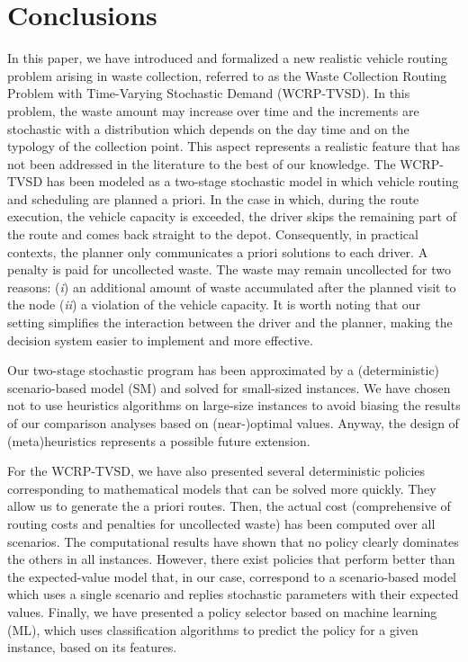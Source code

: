 \documentclass[preprint,11pt,authoryear]{elsarticle}
\begin{document}
\section{Conclusions}\label{end}

In this paper, we have introduced and formalized a new realistic vehicle routing problem arising in waste collection, referred to as the Waste Collection Routing Problem with Time-Varying Stochastic Demand (WCRP-TVSD). 
In this problem, the waste amount may increase over time and the increments are stochastic with a distribution which depends on the day time and on the typology of the collection point. This aspect represents a realistic feature that has not been addressed in the literature to the best of our knowledge.
The WCRP-TVSD has been modeled as a two-stage stochastic model in which vehicle routing and scheduling are planned a priori. In the case in which, during the route execution, the vehicle capacity is exceeded, the driver skips the remaining part of the route and comes back straight to the depot. Consequently, in practical contexts, the planner only communicates a priori solutions to each driver. A penalty is paid for uncollected waste. The waste may remain uncollected for two reasons: (\textit{i}) an additional amount of waste accumulated after the planned visit to the node (\textit{ii}) a violation of the vehicle capacity. 
It is worth noting that our setting simplifies the interaction between the driver and the planner, making the decision system easier to implement and more effective. 

Our two-stage stochastic program has been approximated by a (deterministic) scenario-based model (SM) and solved for small-sized instances.  
We have chosen not to use heuristics algorithms on large-size instances to avoid biasing the results of our comparison analyses based on (near-)optimal values. Anyway, the design of (meta)heuristics represents a possible future extension.

For the WCRP-TVSD, we have also presented several deterministic policies corresponding to mathematical models that can be solved more quickly. 
They allow us to generate the a priori routes. Then, the actual cost (comprehensive of routing costs and penalties for uncollected waste) has been computed over all scenarios. The computational results have shown that no policy clearly dominates the others in all instances. However, there exist policies that perform better than the expected-value model that, in our case, correspond to a scenario-based model which uses a single scenario and replies stochastic parameters with their expected values.
Finally, we have presented a policy selector based on machine learning (ML), which uses classification algorithms to predict the policy for a given instance, based on its features. 
\end{document}

